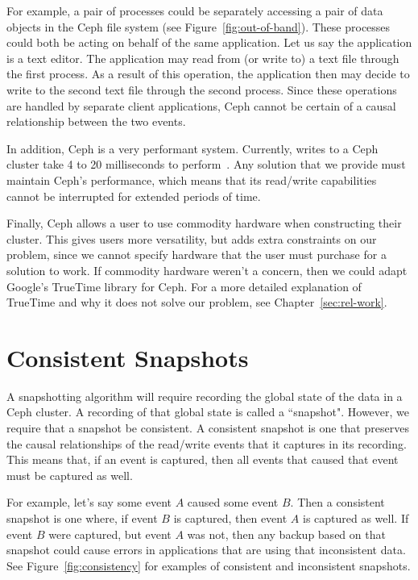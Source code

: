 For example, a pair of processes could be separately accessing a pair of
data objects in the Ceph file system (see
Figure~\ref{fig:out-of-band}). These processes could both be acting on
behalf of the same application. Let us say the application is a text
editor. The application may read from (or write to) a text file
through the first process.  As a result of this operation, the
application then may decide to write to the second text file through
the second process. Since these operations are handled by separate
client applications, Ceph cannot be certain of a causal relationship between the
two events.

In addition, Ceph is a very performant system. Currently, writes to a
Ceph cluster take 4 to 20 milliseconds to perform~\citep{Sage}. Any
solution that we provide must maintain Ceph's performance, which means
that its read/write capabilities cannot be interrupted for extended
periods of time.

Finally, Ceph allows a user to use commodity hardware when
constructing their cluster. This gives users more versatility, but
adds extra constraints on our problem, since we cannot specify
hardware that the user must purchase for a solution to work. If commodity 
hardware weren't a concern, then we could adapt Google's TrueTime library for 
Ceph. For a more detailed explanation of TrueTime
and why it does not solve our problem, see Chapter~\ref{sec:rel-work}.

\section{Consistent Snapshots}

A snapshotting algorithm will require recording the global state of
the data in a Ceph cluster. A recording of that global state is called
a ``snapshot". However, we require that a snapshot be consistent.  A
consistent snapshot is one that preserves the causal relationships of
the read/write events that it captures in its recording. This means that, if an event
is captured, then all events that caused that event must be captured
as well.

For example, let's say some event $A$ caused some event $B$.  Then a
consistent snapshot is one where, if event $B$ is captured, then event
$A$ is captured as well. If event $B$ were captured, but event $A$ was
not, then any backup based on that snapshot could cause errors in
applications that are using that inconsistent data. See
Figure~\ref{fig:consistency} for examples of consistent and
inconsistent snapshots.

